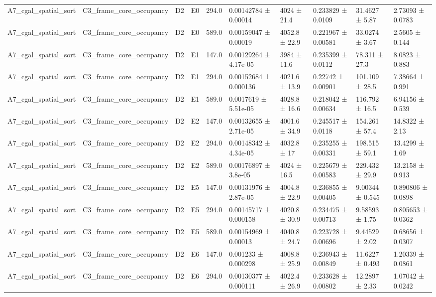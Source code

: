 \begin{table}
\begin{tabular}{llllllllll}
A7\_cgal\_spatial\_sort & C3\_frame\_core\_occupancy & D2 & E0 & 294.0 & 0.00142784 ± 0.00014 & 4024 ± 21.4 & 0.233829 ± 0.0109 & 31.4627 ± 5.87 & 2.73093 ± 0.0783 \\
A7\_cgal\_spatial\_sort & C3\_frame\_core\_occupancy & D2 & E0 & 589.0 & 0.00159047 ± 0.00019 & 4052.8 ± 22.9 & 0.221967 ± 0.00581 & 33.0274 ± 3.67 & 2.5605 ± 0.144 \\
A7\_cgal\_spatial\_sort & C3\_frame\_core\_occupancy & D2 & E1 & 147.0 & 0.00129264 ± 4.17e-05 & 3984 ± 11.6 & 0.235399 ± 0.0112 & 78.311 ± 27.3 & 8.0823 ± 0.883 \\
A7\_cgal\_spatial\_sort & C3\_frame\_core\_occupancy & D2 & E1 & 294.0 & 0.00152684 ± 0.000136 & 4021.6 ± 13.9 & 0.22742 ± 0.00901 & 101.109 ± 28.5 & 7.38664 ± 0.991 \\
A7\_cgal\_spatial\_sort & C3\_frame\_core\_occupancy & D2 & E1 & 589.0 & 0.0017619 ± 5.51e-05 & 4028.8 ± 16.6 & 0.218042 ± 0.00634 & 116.792 ± 16.5 & 6.94156 ± 0.539 \\
A7\_cgal\_spatial\_sort & C3\_frame\_core\_occupancy & D2 & E2 & 147.0 & 0.00132655 ± 2.71e-05 & 4001.6 ± 34.9 & 0.245517 ± 0.0118 & 154.261 ± 57.4 & 14.8322 ± 2.13 \\
A7\_cgal\_spatial\_sort & C3\_frame\_core\_occupancy & D2 & E2 & 294.0 & 0.00148342 ± 4.34e-05 & 4032.8 ± 17 & 0.235255 ± 0.00331 & 198.515 ± 59.1 & 13.4299 ± 1.69 \\
A7\_cgal\_spatial\_sort & C3\_frame\_core\_occupancy & D2 & E2 & 589.0 & 0.00176897 ± 3.8e-05 & 4024 ± 16.5 & 0.225679 ± 0.00583 & 229.432 ± 29.9 & 13.2158 ± 0.913 \\
A7\_cgal\_spatial\_sort & C3\_frame\_core\_occupancy & D2 & E5 & 147.0 & 0.00131976 ± 2.87e-05 & 4004.8 ± 22.9 & 0.236855 ± 0.00405 & 9.00344 ± 0.545 & 0.890806 ± 0.0898 \\
A7\_cgal\_spatial\_sort & C3\_frame\_core\_occupancy & D2 & E5 & 294.0 & 0.00145717 ± 0.000158 & 4020.8 ± 30.9 & 0.234475 ± 0.00713 & 9.58593 ± 1.75 & 0.805653 ± 0.0362 \\
A7\_cgal\_spatial\_sort & C3\_frame\_core\_occupancy & D2 & E5 & 589.0 & 0.00154969 ± 0.00013 & 4040.8 ± 24.7 & 0.223728 ± 0.00696 & 9.44529 ± 2.02 & 0.68656 ± 0.0307 \\
A7\_cgal\_spatial\_sort & C3\_frame\_core\_occupancy & D2 & E6 & 147.0 & 0.001233 ± 0.000298 & 4008.8 ± 25.9 & 0.236943 ± 0.00849 & 11.6227 ± 0.493 & 1.20339 ± 0.0861 \\
A7\_cgal\_spatial\_sort & C3\_frame\_core\_occupancy & D2 & E6 & 294.0 & 0.00130377 ± 0.000111 & 4022.4 ± 26.9 & 0.233628 ± 0.00802 & 12.2897 ± 2.33 & 1.07042 ± 0.0242 \\

\end{tabular}
\end{table}
